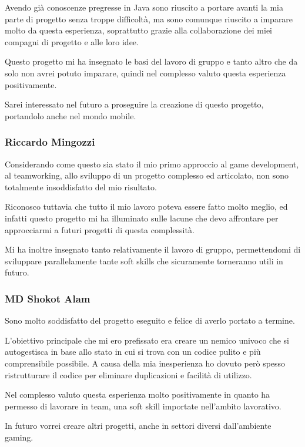 \documentclass[a4paper,12pt]{report}
\begin{document}
Avendo già conoscenze pregresse in Java sono riuscito a portare avanti la mia parte di progetto senza troppe difficoltà, ma sono comunque riuscito a imparare molto da questa esperienza, soprattutto grazie alla collaborazione dei miei compagni di progetto e alle loro idee.

Questo progetto mi ha insegnato le basi del lavoro di gruppo e tanto altro che da solo non avrei potuto imparare, quindi nel complesso valuto questa esperienza positivamente.

Sarei interessato nel futuro a proseguire la creazione di questo progetto, portandolo anche nel mondo mobile.

\subsubsection{Riccardo Mingozzi}

Considerando come questo sia stato il mio primo approccio al game development, al teamworking, allo sviluppo di un progetto complesso ed articolato, non sono totalmente insoddisfatto del mio risultato.

Riconosco tuttavia che tutto il mio lavoro poteva essere fatto molto meglio, ed infatti questo progetto mi ha illuminato sulle lacune che devo affrontare per approcciarmi a futuri progetti di questa complessità. 

Mi ha inoltre insegnato tanto relativamente il lavoro di gruppo, permettendomi di sviluppare parallelamente tante soft skills che sicuramente torneranno utili in futuro.

\subsubsection{MD Shokot Alam}

Sono molto soddisfatto del progetto eseguito e felice  di averlo portato a termine.

L'obiettivo principale  che mi ero prefissato era creare un nemico univoco che si autogestisca in base allo stato in cui si trova con un codice pulito e più comprensibile possibile. A causa della mia inesperienza ho dovuto però spesso ristrutturare il codice per eliminare duplicazioni e facilità di utilizzo. 

Nel complesso valuto questa esperienza molto positivamente in quanto ha permesso di lavorare in team, una soft skill importate nell'ambito lavorativo.

In futuro vorrei creare altri progetti, anche in settori diversi dall'ambiente gaming.
\end{document}
